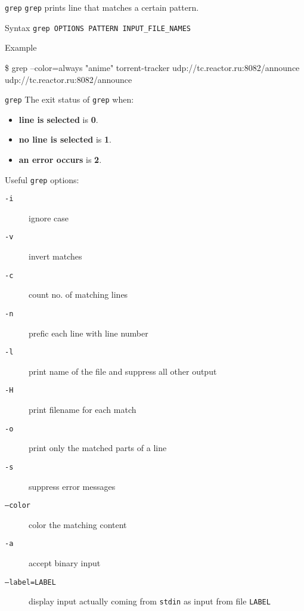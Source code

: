 \documentclass[11pt]{beamer}
\begin{document}
			\begin{frame}[fragile]{\texttt{grep}}
				\texttt{grep} prints line that matches a certain pattern.
				\begin{alertblock}{Syntax}
					\texttt{grep OPTIONS PATTERN INPUT\_FILE\_NAMES}
				\end{alertblock}
				\begin{exampleblock}{Example}
					\begin{semiverbatim}
\$ grep --color=always "anime" torrent-tracker
udp://tc.{\textbf{\color{red}{anime}}}reactor.ru:8082/announce
udp://tc.{\textbf{\color{red}{anime}}}reactor.ru:8082/announce \end{semiverbatim}	
				\end{exampleblock}
			\end{frame}

			\begin{frame}[t, fragile]{\texttt{grep}}
				The exit status of \texttt{grep} when:
				\begin{itemize}
					\item \textbf{line is selected} is \textbf{0}.
					\item \textbf{no line is selected} is \textbf{1}.
					\item \textbf{an error occurs} is \textbf{2}.
				\end{itemize}
				Useful \texttt{grep} options:
				\begin{description}
					\item[ \texttt{-i}] ignore case
					\item[ \texttt{-v}] invert matches
					\item[ \texttt{-c}] count no. of matching lines
					\item[ \texttt{-n}] prefic each line with line number
					\item[ \texttt{-l}] print name of the file and suppress all other output
					\item[ \texttt{-H}] print filename for each match
					\item[ \texttt{-o}] print only the matched parts of a line
					\item[ \texttt{-s}] suppress error messages
					\item[ \texttt{--color}] color the matching content
					\item[ \texttt{-a} ] accept binary input
					\item[ \texttt{--label=LABEL}] display input actually coming from \texttt{stdin} as input from file \texttt{LABEL}
				\end{description}
			\end{frame}
\end{document}

